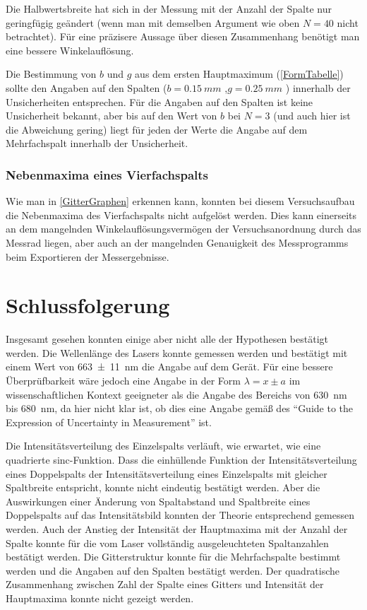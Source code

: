 \documentclass[
	a4paper,
	12pt,
	pagesize,
	ngerman
]{scrartcl}
\begin{document}
	Die Halbwertsbreite hat sich in der Messung mit der Anzahl der Spalte nur geringfügig geändert (wenn man mit demselben Argument wie oben $N=40$ nicht betrachtet).
	Für eine präzisere Aussage über diesen Zusammenhang benötigt man eine bessere Winkelauflösung.
	
	Die Bestimmung von $b $ und $g $ aus dem ersten Hauptmaximum (\cref{FormTabelle}) sollte den Angaben auf den Spalten ($b=\SI{0,15}{mm}$ ,$g=\SI{0,25}{mm}$ ) innerhalb der Unsicherheiten entsprechen.
	Für die Angaben auf den Spalten ist keine Unsicherheit bekannt, aber bis auf den Wert von $b$ bei $N=3$ (und auch hier ist die Abweichung gering) liegt für jeden der Werte die Angabe auf dem Mehrfachspalt innerhalb der Unsicherheit.
	
	\subsubsection{Nebenmaxima eines Vierfachspalts}
	Wie man in \cref{GitterGraphen} erkennen kann, konnten bei diesem Versuchsaufbau die Nebenmaxima des Vierfachspalts nicht aufgelöst werden.
	Dies kann einerseits an dem mangelnden Winkelauflösungsvermögen der Versuchsanordnung durch das Messrad liegen, aber auch an der mangelnden Genauigkeit des Messprogramms beim Exportieren der Messergebnisse.
	
	

	
	\section{Schlussfolgerung}
	Insgesamt gesehen konnten einige aber nicht alle der Hypothesen bestätigt werden.
	Die Wellenlänge des Lasers konnte gemessen werden und bestätigt mit einem Wert von \SI{663\pm 11}{nm} die Angabe auf dem Gerät.
	Für eine bessere Überprüfbarkeit wäre jedoch eine Angabe in der Form $\lambda = x\pm a$ im wissenschaftlichen Kontext geeigneter als die Angabe des Bereichs von \SI{630}{\nano \meter} bis \SI{680}{\nano \meter}, da hier nicht klar ist, ob dies eine Angabe gemäß des \enquote{Guide to the Expression of Uncertainty in Measurement} ist.
	
	Die Intensitätsverteilung des Einzelspalts verläuft, wie erwartet, wie eine quadrierte sinc-Funktion.
	Dass die einhüllende Funktion der Intensitätsverteilung eines Doppelspalts der Intensitätsverteilung eines Einzelspalts mit gleicher Spaltbreite entspricht, konnte nicht eindeutig bestätigt werden.
	Aber die Auswirkungen einer Änderung von Spaltabstand und Spaltbreite eines Doppelspalts auf das Intensitätsbild konnten der Theorie entsprechend gemessen werden.
	Auch der Anstieg der Intensität der Hauptmaxima mit der Anzahl der Spalte konnte für die vom Laser vollständig ausgeleuchteten Spaltanzahlen bestätigt werden.
	Die Gitterstruktur konnte für die Mehrfachspalte bestimmt werden und die Angaben auf den Spalten bestätigt werden.
	Der quadratische Zusammenhang zwischen Zahl der Spalte eines Gitters und Intensität der Hauptmaxima konnte nicht gezeigt werden.
	
\end{document}
